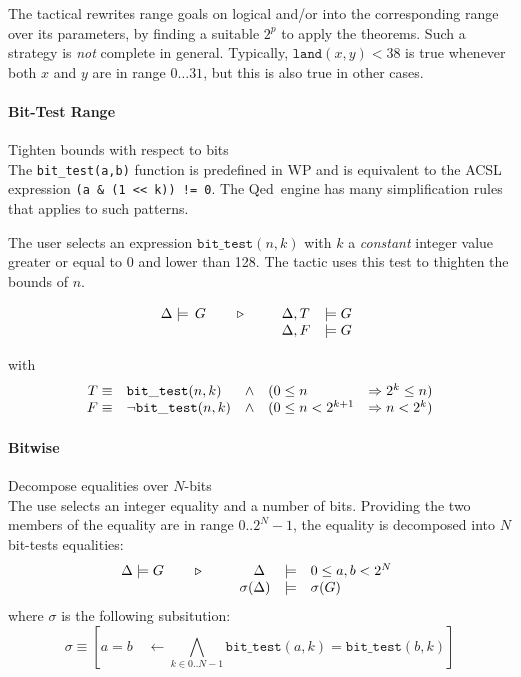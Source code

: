 The tactical rewrites range goals on logical and/or into the corresponding range over its parameters, by finding a suitable $2^p$
to apply the theorems. Such a strategy is \emph{not} complete in general.
Typically, $\mathtt{land}(x,y) < 38$ is true whenever both $x$ and $y$ are in range $0\ldots 31$, but this is also true
in other cases.

\paragraph{Bit-Test Range} Tighten bounds with respect to bits \\
The \lstinline{bit_test(a,b)} function is predefined in \textsf{WP} and is equivalent
to the \textsf{ACSL} expression \lstinline{(a & (1 << k)) != 0}. The
\textsf{Qed} engine has many simplification rules that applies to
such patterns.

The user selects an expression $\mathtt{bit\_test}(n,k)$ with $k$
a \emph{constant} integer value greater or equal to 0 and lower than
128. The tactic uses this test to thighten the bounds of $n$.

$$\TACTIC{\Delta\models\,G}{%
\begin{array}[t]{ll}
\Delta,T &\models G \\
\Delta,F &\models G
\end{array}} $$

with
$$\begin{array}[t]{rlcll}
  T \equiv & \mathtt{bit\_test}(n,k) & \wedge & (0 \leq n & \Rightarrow 2^{k} \leq n) \\
  F \equiv & \neg \mathtt{bit\_test}(n,k) & \wedge & (0 \leq n < 2^{k+1} & \Rightarrow n < 2^{k})
  \end{array}
$$

\paragraph{Bitwise} Decompose equalities over $N$-bits\\
The use selects an integer equality and a number of bits.
Providing the two members of the equality are in range $0..2^N-1$,
the equality is decomposed into $N$ bit-tests equalities:
\[\TACTIC{\Delta\models G}{%
\begin{array}[t]{rcl}
\Delta\phantom{)} &\models & 0 \leq a,b < 2^N \\
\sigma(\Delta) & \models & \sigma(G)
\end{array}
}\]
where $\sigma$ is the following subsitution:
\[ \sigma \equiv
\left[ a=b \quad \leftarrow
\bigwedge_{k\in 0..N-1} \mathtt{bit\_test}(a,k) = \mathtt{bit\_test}(b,k)
\right]
\]

